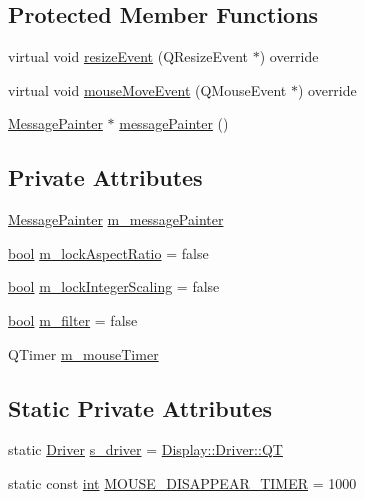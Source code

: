 \subsection*{Protected Member Functions}
\begin{DoxyCompactItemize}
\item 
virtual void \mbox{\hyperlink{class_q_g_b_a_1_1_display_a4fef4c98d3800f017b7df2135a6cd9d1}{resize\+Event}} (Q\+Resize\+Event $\ast$) override
\item 
virtual void \mbox{\hyperlink{class_q_g_b_a_1_1_display_a32c69ce5b7ac9aad71b34d5d269b80bf}{mouse\+Move\+Event}} (Q\+Mouse\+Event $\ast$) override
\item 
\mbox{\hyperlink{class_q_g_b_a_1_1_message_painter}{Message\+Painter}} $\ast$ \mbox{\hyperlink{class_q_g_b_a_1_1_display_a45e9200d5d4ca816d2e9fa9f27fce50e}{message\+Painter}} ()
\end{DoxyCompactItemize}
\subsection*{Private Attributes}
\begin{DoxyCompactItemize}
\item 
\mbox{\hyperlink{class_q_g_b_a_1_1_message_painter}{Message\+Painter}} \mbox{\hyperlink{class_q_g_b_a_1_1_display_a714dab17259b66fab92a7f96aceb5250}{m\+\_\+message\+Painter}}
\item 
\mbox{\hyperlink{libretro_8h_a4a26dcae73fb7e1528214a068aca317e}{bool}} \mbox{\hyperlink{class_q_g_b_a_1_1_display_a9daa5d315fc38986bcfe12adca9c99c0}{m\+\_\+lock\+Aspect\+Ratio}} = false
\item 
\mbox{\hyperlink{libretro_8h_a4a26dcae73fb7e1528214a068aca317e}{bool}} \mbox{\hyperlink{class_q_g_b_a_1_1_display_a522db5d465e8a21d3cccdd5aab48fe44}{m\+\_\+lock\+Integer\+Scaling}} = false
\item 
\mbox{\hyperlink{libretro_8h_a4a26dcae73fb7e1528214a068aca317e}{bool}} \mbox{\hyperlink{class_q_g_b_a_1_1_display_afddadaa9c7e762b3ea45c7335dc98255}{m\+\_\+filter}} = false
\item 
Q\+Timer \mbox{\hyperlink{class_q_g_b_a_1_1_display_a9f1c6865eb72b241a17c7999e822195d}{m\+\_\+mouse\+Timer}}
\end{DoxyCompactItemize}
\subsection*{Static Private Attributes}
\begin{DoxyCompactItemize}
\item 
static \mbox{\hyperlink{class_q_g_b_a_1_1_display_a43f4be6bd7830df1380fcc10165488d0}{Driver}} \mbox{\hyperlink{class_q_g_b_a_1_1_display_a81913c9965b545cd32654647240254f3}{s\+\_\+driver}} = \mbox{\hyperlink{class_q_g_b_a_1_1_display_a43f4be6bd7830df1380fcc10165488d0a33b8d767c1f7c7984d900797e2bb7727}{Display\+::\+Driver\+::\+QT}}
\item 
static const \mbox{\hyperlink{ioapi_8h_a787fa3cf048117ba7123753c1e74fcd6}{int}} \mbox{\hyperlink{class_q_g_b_a_1_1_display_a5c8502158aa4a536c1128d10c7cd43bc}{M\+O\+U\+S\+E\+\_\+\+D\+I\+S\+A\+P\+P\+E\+A\+R\+\_\+\+T\+I\+M\+ER}} = 1000
\end{DoxyCompactItemize}



